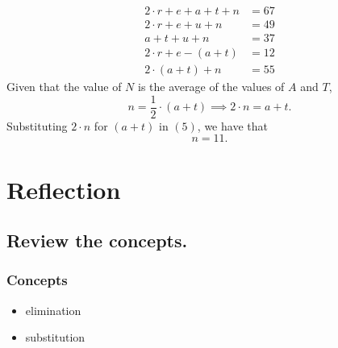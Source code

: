 \documentclass{beamer} %
\begin{document}
\setcounter{equation}{0}

\begin{frame}
  \begin{align}
    2\cdot r+e+a+t+n &= 67 \\
    2\cdot r+e+u+n &= 49   \\
    a+t+u+n &= 37          \\
    2\cdot r+e-(a+t) &= 12 \\
    2\cdot(a+t)+n &= 55
  \end{align}
  Given that the value of $N$ is the average of the values of $A$ and $T$,
  \[
    n=\frac{1}{2}\cdot(a+t) \implies 2 \cdot n = a + t.
  \]
  Substituting $2\cdot n$ for $(a+t)$ in $(5)$, we have that
  \[
    n = \boxed{11}.
  \]
\end{frame}

\setcounter{equation}{0}

\section{Reflection}

\subsection*{Review the concepts.}

\begin{frame}
  \frametitle{Concepts}
  \pause
  \begin{itemize}
    \item elimination \pause
    \item substitution
  \end{itemize}
\end{frame}

\end{document}
